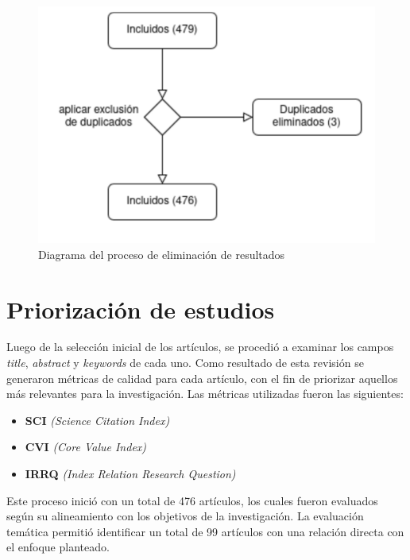 \begin{figure}[H]
	\centering
	\includegraphics[scale=0.9] {tablas-images/sms/eliminacion-duplicados.png}
	\caption{Diagrama del proceso de eliminación de resultados}\label{fig:eliminacion-duplicados}
\end{figure}


\section{Priorización de estudios}\label{sec:priorizacionEstudios}
\noindent


Luego de la selección inicial de los artículos, se procedió a examinar los campos  \textit{title}, \textit{abstract} y \textit{keywords} de cada uno. Como resultado de esta revisión se generaron métricas de calidad para cada artículo, con el fin de priorizar aquellos más relevantes para la investigación. Las métricas utilizadas fueron las siguientes:

\begin{itemize}
	\item \textbf{SCI} \textit{(Science Citation Index)}
	\item \textbf{CVI} \textit{(Core Value Index)}
	\item \textbf{IRRQ} \textit{(Index Relation Research Question)}
\end{itemize}
\noindent

Este proceso inició con un total de 476 artículos, los cuales fueron evaluados según su alineamiento con los objetivos de la investigación. La evaluación temática permitió identificar un total de 99 artículos con una relación directa con el enfoque planteado.

